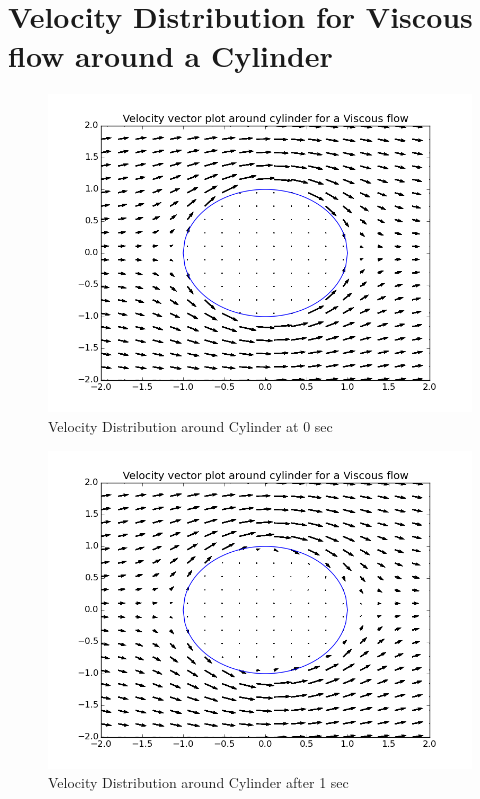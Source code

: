\documentclass{article}
\begin{document}
\newpage
\section{Velocity Distribution for Viscous flow around a Cylinder}

\begin{figure}[H] \label{figure}
\includegraphics[width=12cm]{streamlines.png}
\caption{Velocity Distribution around Cylinder at 0 sec}
\label{figure:}
\end{figure}

\begin{figure}[H] \label{figure}
\includegraphics[width=12cm]{streamlines_one.png}
\caption{Velocity Distribution around Cylinder after 1 sec}
\label{figure:}
\end{figure}
\end{document}
